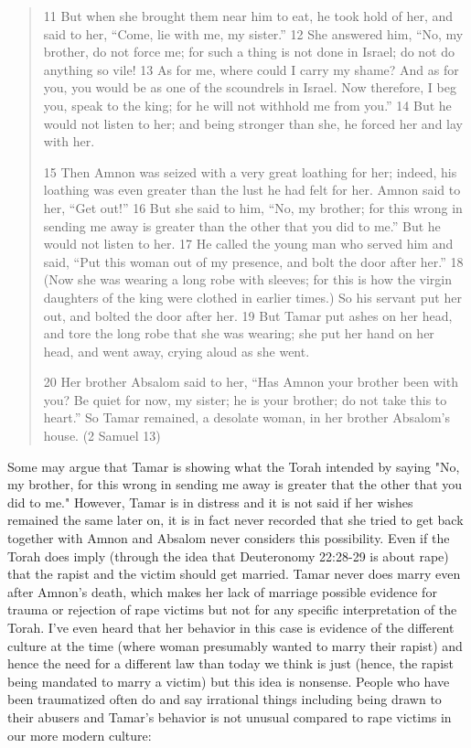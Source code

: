\documentclass[11pt]{article}
\begin{document}
\begin{quote}
11 But when she brought them near him to eat, he took hold of her, and said to her, “Come, lie with me, my sister.” 12 She answered him, “No, my brother, do not force me; for such a thing is not done in Israel; do not do anything so vile! 13 As for me, where could I carry my shame? And as for you, you would be as one of the scoundrels in Israel. Now therefore, I beg you, speak to the king; for he will not withhold me from you.” 14 But he would not listen to her; and being stronger than she, he forced her and lay with her.

15 Then Amnon was seized with a very great loathing for her; indeed, his loathing was even greater than the lust he had felt for her. Amnon said to her, “Get out!” 16 But she said to him, “No, my brother; for this wrong in sending me away is greater than the other that you did to me.” But he would not listen to her.
17 He called the young man who served him and said, “Put this woman out of my presence, and bolt the door after her.” 18 (Now she was wearing a long robe with sleeves; for this is how the virgin daughters of the king were clothed in earlier times.) So his servant put her out, and bolted the door after her. 19 But Tamar put ashes on her head, and tore the long robe that she was wearing; she put her hand on her head, and went away, crying aloud as she went.

20 Her brother Absalom said to her, “Has Amnon your brother been with you? Be quiet for now, my sister; he is your brother; do not take this to heart.” So Tamar remained, a desolate woman, in her brother Absalom’s house.
(2 Samuel 13)
\end{quote}

Some may argue that Tamar is showing what the Torah intended by saying "No, my brother, for this wrong in sending me away is greater that the other that you did to me." However, Tamar is in distress and it is not said if her wishes remained the same later on, it is in fact never recorded that she tried to get back together with Amnon and Absalom never considers this possibility. Even if the Torah does imply (through the idea that Deuteronomy 22:28-29 is about rape) that the rapist and the victim should get married. Tamar never does marry even after Amnon's death, which makes her lack of marriage possible evidence for trauma or rejection of rape victims but not for any specific interpretation of the Torah. I've even heard that her behavior in this case is evidence of the different culture at the time (where woman presumably wanted to marry their rapist) and hence the need for a different law than today we think is just (hence, the rapist being mandated to marry a victim) but this idea is nonsense. People who have been traumatized often do and say irrational things including being drawn to their abusers and Tamar's behavior is not unusual compared to rape victims in our more modern culture:
\end{document}
